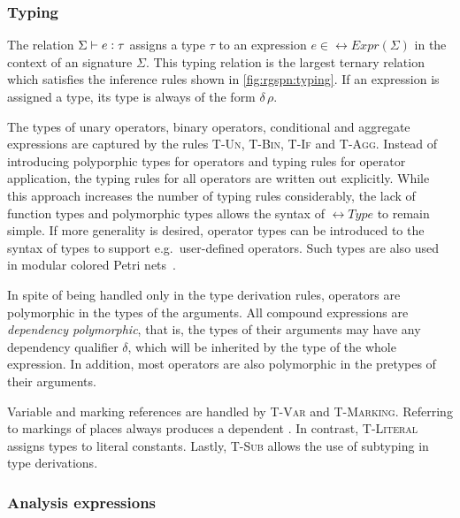 \subsubsection{Typing}

The relation \(\Sigma \vdash e \mathrel{\vcentcolon} \tau\) assigns a type \(\tau\) to an expression \(e \in \rel{Expr}(\Sigma)\) in the context of an  signature \(\Sigma\). This typing relation is the largest ternary relation which satisfies the inference rules shown in \cref{fig:rgspn:typing}. If an expression is assigned a type, its type is always of the form \(\delta\,\rho\).

The types of unary operators, binary operators, conditional and aggregate expressions are captured by the rules \textsc{T-Un}, \textsc{T-Bin}, \textsc{T-If} and \textsc{T-Agg}. Instead of introducing polyporphic types for operators and typing rules for operator application, the typing rules for all operators are written out explicitly. While this approach increases the number of typing rules considerably, the lack of function types and polymorphic types allows the syntax of \(\rel{Type}\) to remain simple. If more generality is desired, operator types can be introduced to the syntax of types to support e.g.~user-defined operators. Such types are also used in modular colored Petri nets~\citep{Kindler07modular}.

In spite of being handled only in the type derivation rules, operators are polymorphic in the types of the arguments. All compound expressions are \emph{dependency polymorphic}, that is, the types of their arguments may have any dependency qualifier \(\delta\), which will be inherited by the type of the whole expression. In addition, most operators are also polymorphic in the pretypes of their arguments.

Variable and marking references are handled by \textsc{T-Var} and \textsc{T-Marking}. Referring to markings of places always produces a  dependent . In contrast, \textsc{T-Literal} assigns  types to literal constants. Lastly, \textsc{T-Sub} allows the use of subtyping in type derivations.

\subsubsection{Analysis expressions}

